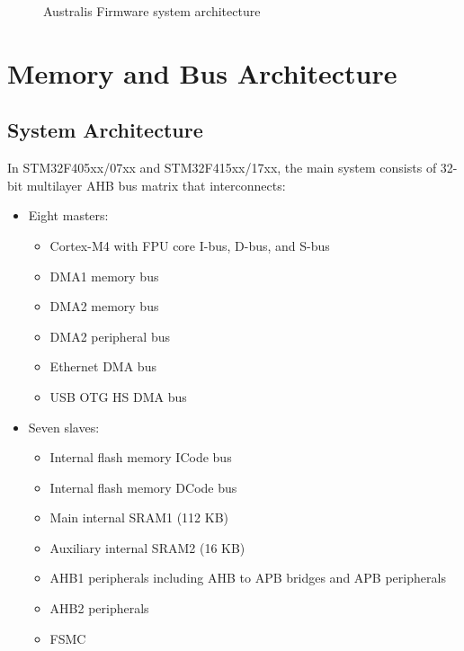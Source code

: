 \begin{figure}[h]
    \caption{Australis Firmware system architecture}
\end{figure}

\clearpage

\section{Memory and Bus Architecture}
\subsection{System Architecture}

In STM32F405xx/07xx and STM32F415xx/17xx, the main system consists of 32-bit 
multilayer AHB bus matrix that interconnects:
\begin{itemize}
    \item Eight masters:
    \begin{itemize}
        \item Cortex\textsuperscript{\textregistered}-M4 with FPU core I-bus, D-bus, and S-bus
        \item DMA1 memory bus
        \item DMA2 memory bus
        \item DMA2 peripheral bus
        \item Ethernet DMA bus
        \item USB OTG HS DMA bus
    \end{itemize}
    \item Seven slaves:
    \begin{itemize}
        \item Internal flash memory ICode bus
        \item Internal flash memory DCode bus
        \item Main internal SRAM1 (112 KB)
        \item Auxiliary internal SRAM2 (16 KB)
        \item AHB1 peripherals including AHB to APB bridges and APB peripherals
        \item AHB2 peripherals
        \item FSMC
    \end{itemize}
\end{itemize}

